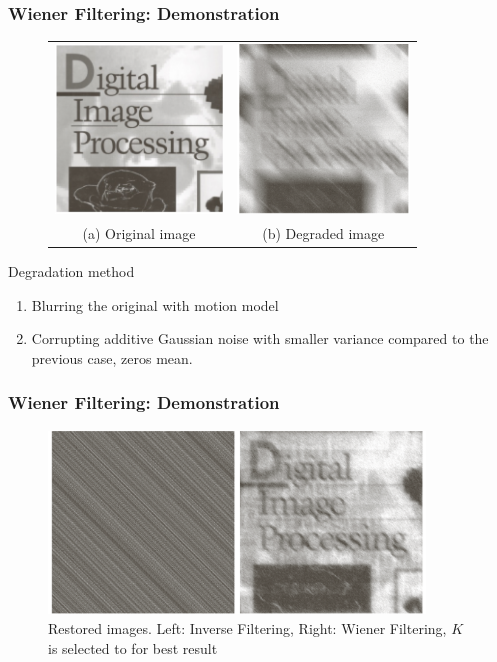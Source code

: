 \documentclass[english,11pt,table,handout]{beamer}
\begin{document}
\frame
{
	\frametitle{Wiener Filtering: Demonstration }
	
	\begin{figure}[!h]
		\begin{tabular}{cc}
			\includegraphics[height=4.5cm]{book_original.png} &
			\includegraphics[height=4.5cm]{book_degrad_2.png} \\
			(a) Original image & (b) Degraded image\\
		\end{tabular}
	\end{figure}
	\begin{block}{Degradation method}
		\begin{enumerate}
			\item Blurring the original with motion model
			\item Corrupting additive Gaussian noise with smaller variance compared to the previous case, zeros mean.
		\end{enumerate}
	\end{block}
}
\frame
{
	\frametitle{Wiener Filtering: Demonstration }
	
	\begin{figure}[!h]
		\includegraphics[width=10cm]{book_restore_2.png}
		\caption{Restored images. Left: \alert{Inverse Filtering}, Right: \alert{Wiener Filtering}, $K$ is selected to for best result}
	\end{figure}
	
}
\end{document}
